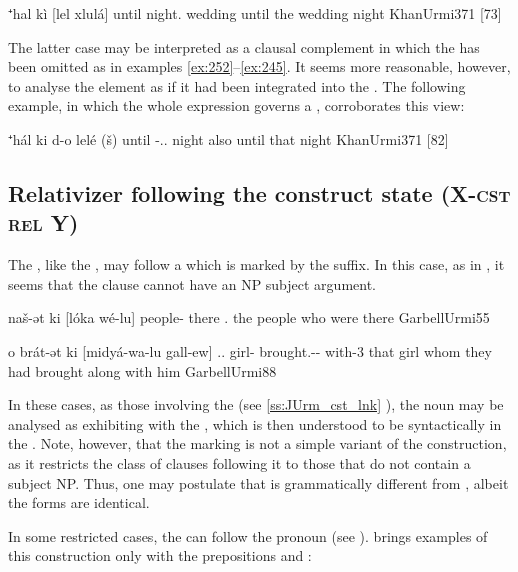 {⁺hal\cb{} kì [lel\cb{} xlulá]}
{until\cb{} \rel{} night.\cst{}\cb{} wedding}
{until the wedding night}
{KhanUrmi}{371 {[73]}}

The latter case may be interpreted as a clausal complement in which the   has been omitted as in examples \ref{ex:252}--\ref{ex:245}. It seems more reasonable, however, to analyse the element  as if it had been integrated into the  . The following example,  in which the whole expression  governs a , corroborates this view: 

{⁺hál ki\cb{} d-o\cb{} lelé (\cb{}š)}
{until \rel\cb{} \gen-\dem.\far.\masc\cb{} night \cb{}also}
{until that night}
{KhanUrmi}{371 {[82]}}

\largerpage
\subsection{Relativizer following the construct state (X-\textsc{cst} \textsc{rel} Y)}

The \rel*, like the \lnk*, may follow a  which is marked by the \cst* suffix. In this case, as in , it seems that the clause cannot have an NP subject argument.

{naš-ət ki [lóka wé-lu]}
{people-\cst{} \rel{} there \cop.\pl}
{the people who were there}
{GarbellUrmi}{55}

{o brát-ət ki [midyá-wa-lu gall-ew]}
{\dem.\far.\sg{} girl-\cst{} \rel{} brought.\fem-\pst-\pl{} with-3\masc}
{that girl whom they had brought along with him}
{GarbellUrmi}{88}

In these cases, as those involving the \lnk* (see \ref{ss:JUrm_cst_lnk} ), the \prim noun may be analysed as exhibiting  with the , which is then understood to be syntactically in the \cst*.  Note, however, that the \cst* marking is not a simple variant of the construction,  as it restricts the class of \secn clauses following it to those that do not contain a subject NP. Thus, one may postulate that  is grammatically different from , albeit the  forms are identical.

In some restricted cases, the  can follow the \cst* pronoun  (see ). \citet[374--5]{KhanUrmi} brings examples of this construction only with the prepositions  and :

